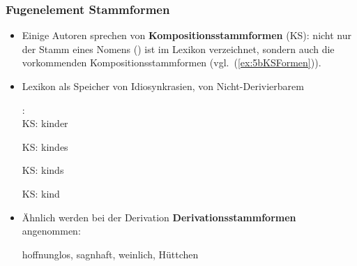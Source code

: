 \begin{frame}
\frametitle{Fugenelement \vs Stammformen}

\begin{itemize}
	\item Einige Autoren \citep[vgl.][211ff; 227ff]{Eisenberg00a} sprechen von \textbf{Kompositionsstammformen} (KS): nicht nur der Stamm eines Nomens (\zB {}) ist im Lexikon verzeichnet, sondern auch die vorkommenden Kompositionsstammformen (vgl.\ (\ref{ex:5bKSFormen})).
	
	\item Lexikon als Speicher von Idiosynkrasien, \dash von Nicht-Derivierbarem
	
	\settowidth{} 
	\ea\label{ex:5bKSFormen} :\\
	KS: kinder  
	
	KS: kindes  
	
	KS: kinds 
	
	KS: kind 
	\z    
	
	\item Ähnlich werden bei der Derivation \textbf{Derivationsstammformen} angenommen:
	
	\ea hoffnunglos, sagnhaft, weinlich, Hütt\alertred{\_}chen
	\z

\end{itemize}

\end{frame}


